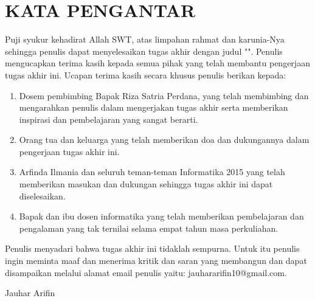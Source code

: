 \clearpage

\chapter*{\uppercase{Kata Pengantar}}

\par Puji syukur kehadirat Allah SWT, atas limpahan rahmat dan karunia-Nya sehingga penulis dapat menyelesaikan tugas akhir dengan judul "\thetitle". Penulis mengucapkan terima kasih kepada semua pihak yang telah membantu pengerjaan tugas akhir ini. Ucapan terima kasih secara khusus penulis berikan kepada:

\begin{enumerate}
    \item Dosem pembimbing Bapak Riza Satria Perdana, yang telah membimbing dan mengarahkan penulis dalam mengerjakan tugas akhir serta memberikan inspirasi dan pembelajaran yang sangat berarti.
    \item Orang tua dan keluarga yang telah memberikan doa dan dukungannya dalam pengerjaan tugas akhir ini.
    \item Arfinda Ilmania dan seluruh teman-teman Informatika 2015 yang telah memberikan masukan dan dukungan sehingga tugas akhir ini dapat diselesaikan.
    \item Bapak dan ibu dosen informatika yang telah memberikan pembelajaran dan pengalaman yang tak ternilai selama empat tahun masa perkuliahan.
\end{enumerate}

\par Penulis menyadari bahwa tugas akhir ini tidaklah sempurna. Untuk itu penulis ingin meminta maaf dan menerima kritik dan saran yang membangun dan dapat disampaikan melalui alamat email penulis yaitu: jauhararifin10@gmail.com.

\begin{flushright}
Jauhar Arifin
\end{flushright}

\clearpage